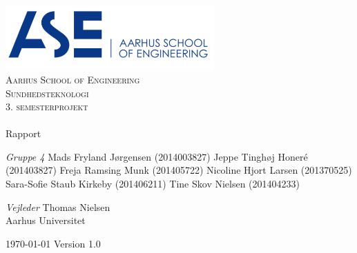 \begin{titlingpage}
\begin{center}

~ \\[3cm]

\includegraphics[width=0.6\textwidth]{figurer/ASE}~\\[1cm]

\textsc{\LARGE Aarhus School of Engineering}\\[1.5cm]

\textsc{\Large Sundhedsteknologi}\\
\textsc{\Large 3. semesterprojekt}\\[0.5cm]

\noindent\makebox[\linewidth]{\rule{\textwidth}{0.4pt}}\\
[0.5cm]{\Huge Rapport}
\noindent\makebox[\linewidth]{\rule{\textwidth}{0.4pt}}

\end{center}

\textit{Gruppe 4} \newline
Mads Fryland J\o rgensen (2014003827) \newline
Jeppe Tingh\o j Honeré (201403827) \newline
Freja Ramsing Munk (201405722) \newline		 
Nicoline Hjort Larsen (201370525) \newline 
Sara-Sofie Staub Kirkeby (201406211) \newline
Tine Skov Nielsen (201404233) \newline


\textit{Vejleder} \newline
Thomas Nielsen\\
Aarhus Universitet


\vfill

\begin{center}
{\large \today}
Version 1.0
\end{center}


\end{titlingpage}